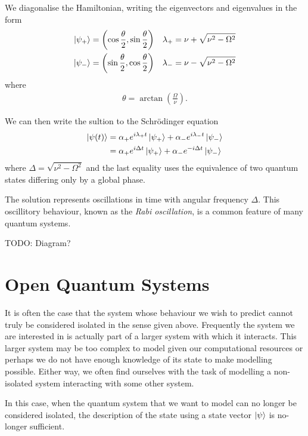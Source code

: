We diagonalise the Hamiltonian, writing the eigenvectors and eigenvalues in the form
\begin{align}
  \left\vert\psi_+\right\rangle &=  \left(\cos\frac{\theta}{2}, \sin\frac{\theta}{2}\right)  &\lambda_{+} = \nu + \sqrt{\nu^2 - \Omega^2} \\
  \left\vert\psi_-\right\rangle &=  \left(\sin\frac{\theta}{2}, \cos\frac{\theta}{2}\right)  &\lambda_{-} = \nu - \sqrt{\nu^2 - \Omega^2} 
\end{align}
where
\begin{align}
  \theta = \arctan\left(\frac{\Omega}{\nu}\right).
\end{align}

We can then write the sultion to the Schr\"odinger equation
\begin{align}
  \left\vert\psi(t)\right\rangle &= \alpha_{+} e^{i\lambda_{+}t}\left\vert\psi_{+}\right\rangle +  \alpha_{-} e^{i\lambda_{-}t} \left\vert\psi_{-}\right\rangle \\
  &= \alpha_{+} e^{i\Delta t}\left\vert\psi_{+}\right\rangle +  \alpha_{-} e^{- i\Delta t} \left\vert\psi_{-}\right\rangle 
\end{align}
where $\Delta = \sqrt{\nu^2 - \Omega^2}$ and the last equality uses the equivalence of two quantum states differing only by a global phase. 

The solution represents oscillations in time with angular frequency $\Delta$. This oscillitory behaviour, known as the \textit{Rabi oscillation}, is a common feature of many quantum systems.

TODO: Diagram?

\section{Open Quantum Systems}

It is often the case that the system whose behaviour we wish to predict cannot truly be considered isolated in the sense given above. Frequently the system we are interested in is actually part of a larger system with which it interacts. This larger system may be too complex to model given our computational resources or perhaps we do not have enough knowledge of its state to make modelling possible. Either way, we often find ourselves with the task of modelling a non-isolated system interacting with some other system. 

In this case, when the quantum system that we want to model can no longer be considered isolated, the description of the state using a state vector $\left\vert\psi\right\rangle$ is no-longer sufficient.

